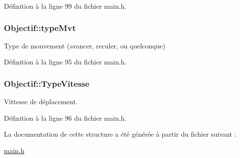 Définition à la ligne 99 du fichier main.\+h.

\hypertarget{struct_objectif_a4218bcb4ee981dd69d5bfd59ab0804e2}{
\subsubsection[{type\+Mvt}]{ Objectif\+::type\+Mvt}}\label{struct_objectif_a4218bcb4ee981dd69d5bfd59ab0804e2}


Type de mouvement (avancer, reculer, ou quelconque) 



Définition à la ligne 95 du fichier main.\+h.

\hypertarget{struct_objectif_acbd7353e97f08e474866c500e2439203}{
\subsubsection[{Type\+Vitesse}]{ Objectif\+::\+Type\+Vitesse}}\label{struct_objectif_acbd7353e97f08e474866c500e2439203}


Vittesse de déplacement. 



Définition à la ligne 96 du fichier main.\+h.



La documentation de cette structure a été générée à partir du fichier suivant \+:\begin{DoxyCompactItemize}
\item 
\hyperlink{main_8h}{main.\+h}\end{DoxyCompactItemize}
